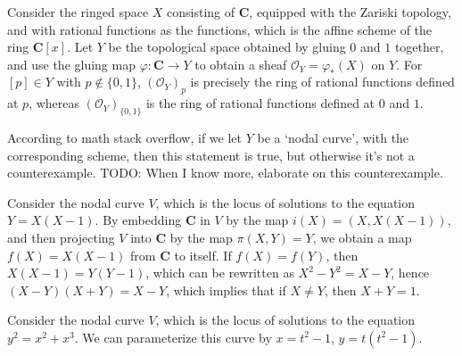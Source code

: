 \begin{example}
    Consider the ringed space $X$ consisting of $\mathbf{C}$, equipped with the Zariski topology, and with rational functions as the functions, which is the affine scheme of the ring $\mathbf{C}[x]$. Let $Y$ be the topological space obtained by gluing $0$ and $1$ together, and use the gluing map $\varphi: \mathbf{C} \to Y$ to obtain a sheaf $\mathcal{O}_Y = \varphi_*(X)$ on $Y$. For $[p] \in Y$ with $p \not \in \{ 0, 1 \}$, $(\mathcal{O}_Y)_p$ is precisely the ring of rational functions defined at $p$, whereas $(\mathcal{O}_Y)_{\{0,1\}}$ is the ring of rational functions defined at $0$ and $1$.

    According to math stack overflow, if we let $Y$ be a `nodal curve', with the corresponding scheme, then this statement is true, but otherwise it's not a counterexample. TODO: When I know more, elaborate on this counterexample.    

    Consider the nodal curve $V$, which is the locus of solutions to the equation $Y = X(X-1)$. By embedding $\mathbf{C}$ in $V$ by the map $i(X) = (X,X(X-1))$, and then projecting $V$ into $\mathbf{C}$ by the map $\pi(X,Y) = Y$, we obtain a map $f(X) = X(X-1)$ from $\mathbf{C}$ to itself. If $f(X) = f(Y)$, then $X(X-1) = Y(Y-1)$, which can be rewritten as $X^2 - Y^2 = X - Y$, hence $(X-Y)(X+Y) = X - Y$, which implies that if $X \neq Y$, then $X + Y = 1$.

    Consider the nodal curve $V$, which is the locus of solutions to the equation $y^2 = x^2 + x^3$. We can parameterize this curve by $x = t^2 - 1$, $y = t(t^2 - 1)$.






\end{example}

